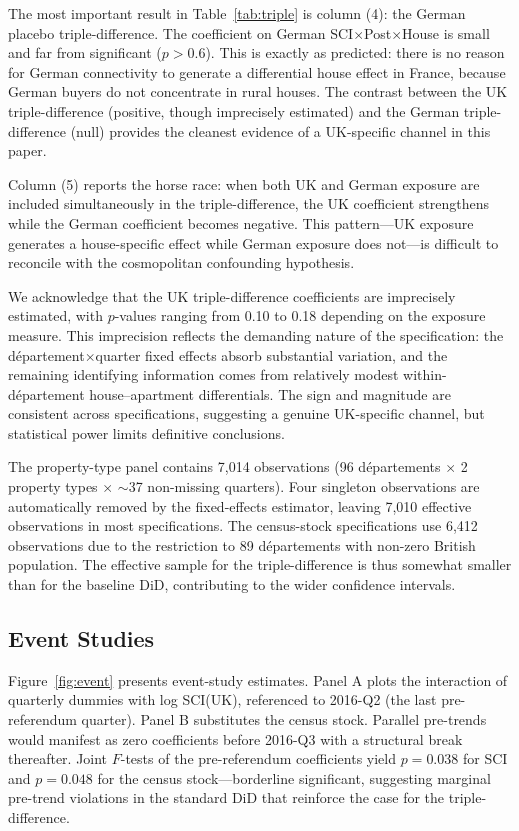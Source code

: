 \documentclass[12pt]{article}
\begin{document}
The most important result in Table~\ref{tab:triple} is column (4): the German placebo triple-difference. The coefficient on German SCI$\times$Post$\times$House is small and far from significant ($p > 0.6$). This is exactly as predicted: there is no reason for German connectivity to generate a differential house effect in France, because German buyers do not concentrate in rural houses. The contrast between the UK triple-difference (positive, though imprecisely estimated) and the German triple-difference (null) provides the cleanest evidence of a UK-specific channel in this paper.

Column (5) reports the horse race: when both UK and German exposure are included simultaneously in the triple-difference, the UK coefficient strengthens while the German coefficient becomes negative. This pattern---UK exposure generates a house-specific effect while German exposure does not---is difficult to reconcile with the cosmopolitan confounding hypothesis.

We acknowledge that the UK triple-difference coefficients are imprecisely estimated, with $p$-values ranging from 0.10 to 0.18 depending on the exposure measure. This imprecision reflects the demanding nature of the specification: the d\'epartement$\times$quarter fixed effects absorb substantial variation, and the remaining identifying information comes from relatively modest within-d\'epartement house--apartment differentials. The sign and magnitude are consistent across specifications, suggesting a genuine UK-specific channel, but statistical power limits definitive conclusions.

The property-type panel contains 7,014 observations (96 d\'epartements $\times$ 2 property types $\times$ $\sim$37 non-missing quarters). Four singleton observations are automatically removed by the fixed-effects estimator, leaving 7,010 effective observations in most specifications. The census-stock specifications use 6,412 observations due to the restriction to 89 d\'epartements with non-zero British population. The effective sample for the triple-difference is thus somewhat smaller than for the baseline DiD, contributing to the wider confidence intervals.

\subsection{Event Studies}

Figure~\ref{fig:event} presents event-study estimates. Panel A plots the interaction of quarterly dummies with log SCI(UK), referenced to 2016-Q2 (the last pre-referendum quarter). Panel B substitutes the census stock. Parallel pre-trends would manifest as zero coefficients before 2016-Q3 with a structural break thereafter. Joint $F$-tests of the pre-referendum coefficients yield $p = 0.038$ for SCI and $p = 0.048$ for the census stock---borderline significant, suggesting marginal pre-trend violations in the standard DiD that reinforce the case for the triple-difference.
\end{document}
